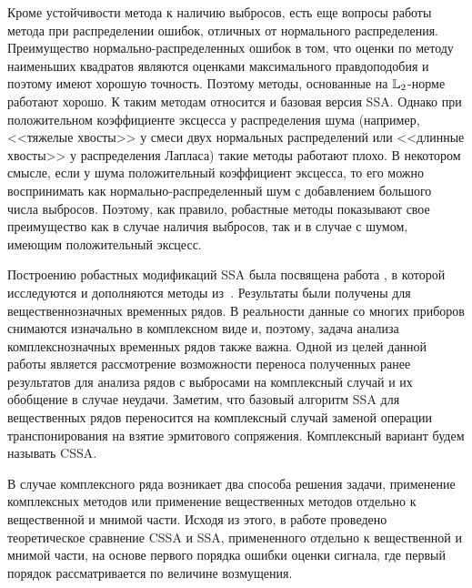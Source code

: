 \documentclass[specialist,
               substylefile = spbu.rtx,
               subf,href,colorlinks=true, 12pt]{disser}
\begin{document}
Кроме устойчивости метода к наличию выбросов, есть еще вопросы работы метода при распределении ошибок, отличных от нормального распределения. Преимущество нормально-распределенных ошибок в том, что оценки по методу наименьших квадратов являются оценками максимального правдоподобия и поэтому имеют хорошую точность. Поэтому методы, основанные на $\mathbb{L}_2$-норме работают хорошо. К таким методам относится и базовая версия SSA. Однако при положительном коэффициенте эксцесса у распределения шума (например, <<тяжелые хвосты>> у смеси двух нормальных распределений или <<длинные хвосты>> у распределения Лапласа) такие методы работают плохо. В некотором смысле, если у шума положительный коэффициент эксцесса, то его можно воспринимать как нормально-распределенный шум с добавлением большого числа выбросов. Поэтому, как правило, робастные методы показывают свое преимущество как в случае наличия выбросов, так и в случае с шумом, имеющим положительный эксцесс.


Построению робастных модификаций SSA была посвящена работа \cite{Tretyakova20}, в которой исследуются и дополняются методы из~\cite{Trickett.etal2012,Kalantari.etal2016}. Результаты были получены для вещественнозначных временных рядов. В реальности данные со многих приборов снимаются изначально в комплексном виде и, поэтому, задача анализа комплекснозначных временных рядов также важна. Одной из целей данной работы является рассмотрение возможности переноса полученных ранее результатов для анализа рядов с выбросами на комплексный случай и их обобщение в случае неудачи. Заметим, что базовый алгоритм SSA для вещественных рядов переносится на комплексный случай заменой операции транспонирования на взятие эрмитового сопряжения. Комплексный вариант будем называть CSSA.

В случае комплексного ряда возникает два способа решения задачи, применение комплексных методов или применение вещественных методов отдельно к вещественной и мнимой части. Исходя из этого, в работе проведено теоретическое сравнение CSSA и SSA, примененного отдельно к вещественной и мнимой части, на основе первого порядка ошибки оценки сигнала, где первый порядок рассматривается по величине возмущения.
\end{document}
